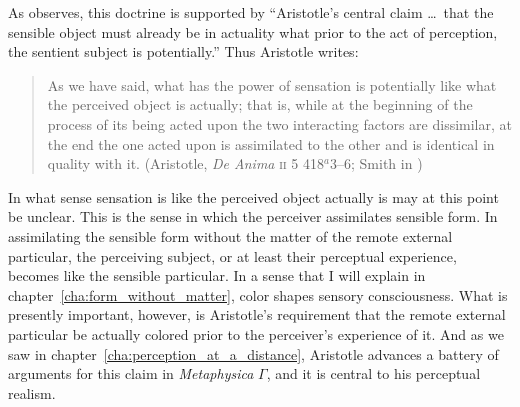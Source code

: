 As \citet[29, n13]{Burnyeat:1982mz} observes, this doctrine is supported by ``Aristotle's central claim \ldots\ that the sensible object must already be in actuality what prior to the act of perception, the sentient subject is potentially.'' Thus Aristotle writes:
\begin{quote}
	As we have said, what has the power of sensation is potentially like what the perceived object is actually; that is, while at the beginning of the process of its being acted upon the two interacting factors are dissimilar, at the end the one acted upon is assimilated to the other and is identical in quality with it. (Aristotle, \emph{De Anima} \textsc{ii} 5 418\( ^{a} \)3--6; Smith in \citealt[31]{Barnes:1984uq})
\end{quote}
In what sense sensation is like the perceived object actually is may at this point be unclear. This is the sense in which the perceiver assimilates sensible form. In assimilating the sensible form without the matter of the remote external particular, the perceiving subject, or at least their perceptual experience, becomes like the sensible particular. In a sense that I will explain in chapter~\ref{cha:form_without_matter}, color shapes sensory consciousness. What is presently important, however, is Aristotle's requirement that the remote external particular be actually colored prior to the perceiver's experience of it. And as we saw in chapter~\ref{cha:perception_at_a_distance}, Aristotle advances a battery of arguments for this claim in \emph{Metaphysica} \( \Gamma \), and it is central to his perceptual realism.

